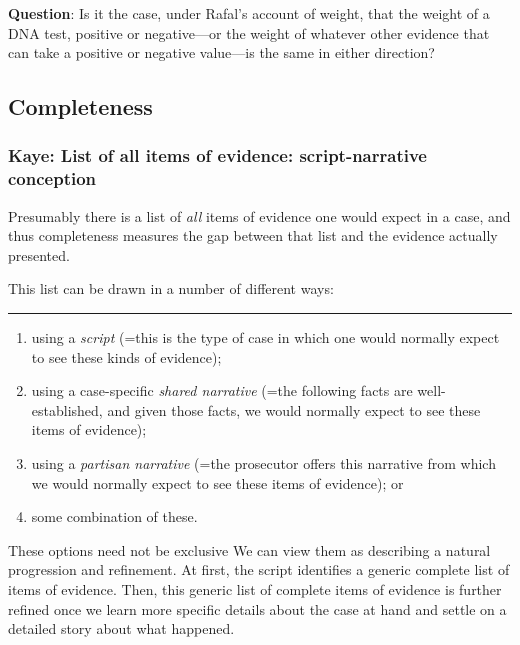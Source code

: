 \documentclass[
  10pt,
  dvipsnames,enabledeprecatedfontcommands]{scrartcl}
\begin{document}
\textbf{Question}: Is it the case, under Rafal's account of weight, that
the weight of a DNA test, positive or negative---or the weight of
whatever other evidence that can take a positive or negative value---is
the same in either direction?


\hypertarget{completeness}{%
\subsection{Completeness}\label{completeness}}

\hypertarget{kaye-list-of-all-items-of-evidence-script-narrative-conception}{%
\subsubsection{Kaye: List of all items of evidence: script-narrative
conception}\label{kaye-list-of-all-items-of-evidence-script-narrative-conception}}

Presumably there is a list of \emph{all} items of evidence one would
expect in a case, and thus completeness measures the gap between that
list and the evidence actually presented.

This list can be drawn in a number of different ways:

\begin{center}\rule{0.5\linewidth}{0.5pt}\end{center}

\begin{enumerate}
\def\labelenumi{(\alph{enumi})}
\item
  using a \emph{script} (=this is the type of case in which one would
  normally expect to see these kinds of evidence);
\item
  using a case-specific \emph{shared narrative} (=the following facts
  are well-established, and given those facts, we would normally expect
  to see these items of evidence);
\item
  using a \emph{partisan narrative} (=the prosecutor offers this
  narrative from which we would normally expect to see these items of
  evidence); or
\item
  some combination of these.
\end{enumerate}

These options need not be exclusive We can view them as describing a
natural progression and refinement. At first, the script identifies a
generic complete list of items of evidence. Then, this generic list of
complete items of evidence is further refined once we learn more
specific details about the case at hand and settle on a detailed story
about what happened.
\end{document}
